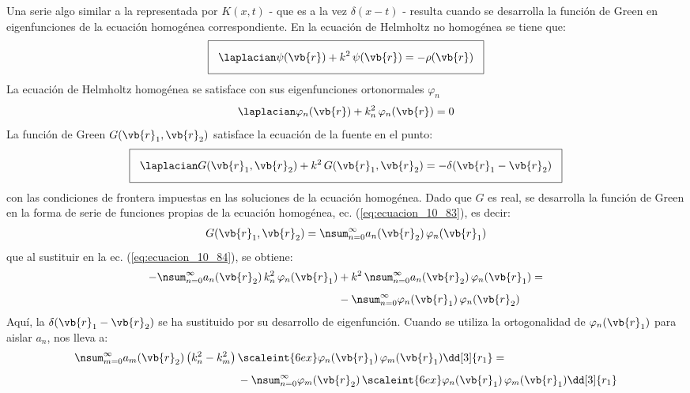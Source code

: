 Una serie algo similar a la representada por $K (x, t)$ - que es a la vez $\delta (x - t)$ - resulta cuando se desarrolla la función de Green en eigenfunciones de la ecuación homogénea correspondiente. En la ecuación de Helmholtz no homogénea se tiene que:
\begin{align}
\setlength{\fboxsep}{3\fboxsep}\boxed{
\laplacian \psi (\vb{r}) + k^{2} \, \psi (\vb{r}) = - \rho (\vb{r})
\label{eq:ecuacion_10_82}}
\end{align}
La ecuación de Helmholtz homogénea se satisface con sus eigenfunciones ortonormales $\varphi_{n}$
\begin{align}
\laplacian \varphi_{n} (\vb{r}) + k_{n}^{2} \, \varphi_{n} (\vb{r}) = 0
\label{eq:ecuacion_10_83}
\end{align} 
La función de Green $G (\vb{r}_{1}, \vb{r}_{2})$ satisface la ecuación de la fuente en el punto:
\begin{align}
\setlength{\fboxsep}{3\fboxsep}\boxed{
\laplacian G (\vb{r}_{1}, \vb{r}_{2}) + k^{2} \, G (\vb{r}_{1}, \vb{r}_{2}) = - \delta (\vb{r}_{1} - \vb{r}_{2})}
\label{eq:ecuacion_10_84}
\end{align}
con las condiciones de frontera impuestas en las soluciones de la ecuación homogénea. Dado que $G$ es real, se desarrolla la función de Green en la forma de serie de funciones propias de la ecuación homogénea, ec. (\ref{eq:ecuacion_10_83}), es decir:
\begin{align}
G (\vb{r}_{1}, \vb{r}_{2}) = \nsum_{n=0}^{\infty} a_{n} (\vb{r}_{2}) \, \varphi_{n} (\vb{r}_{1})
\label{eq:ecuacion_10_85}
\end{align}
que al sustituir en la ec. (\ref{eq:ecuacion_10_84}), se obtiene:
\begin{align}
\begin{aligned}[b]
- \nsum_{n=0}^{\infty} a_{n} (\vb{r}_{2}) \, k_{n}^{2} \, \varphi_{n} (\vb{r}_{1}) &+ k^{2} \, \nsum_{n=0}^{\infty} a_{n} (\vb{r}_{2}) \, \varphi_{n} (\vb{r}_{1}) = \\[0.5em]
&- \nsum_{n=0}^{\infty} \varphi_{n} (\vb{r}_{1}) \, \varphi_{n} (\vb{r}_{2})
\end{aligned}
\label{eq:ecuacion_10_86}
\end{align}
Aquí, la $\delta (\vb{r}_{1} - \vb{r}_{2})$ se ha sustituido por su desarrollo de eigenfunción. Cuando se utiliza la ortogonalidad de $\varphi_{n} (\vb{r}_{1})$ para aislar $a_{n}$, nos lleva a:
\begin{align*}
\nsum_{m=0}^{\infty} a_{m} (\vb{r}_{2}) \, \big( k_{n}^{2} - k_{m}^{2} \big) \, &\scaleint{6ex} \varphi_{n} (\vb{r}_{1}) \, \varphi_{m} (\vb{r}_{1}) \dd[3]{r_{1}} = \\[0.5em]
&- \nsum_{n=0}^{\infty} \varphi_{m} (\vb{r}_{2})  \, \scaleint{6ex} \varphi_{n} (\vb{r}_{1}) \, \varphi_{m} (\vb{r}_{1}) \dd[3]{r_{1}}    
\end{align*} 
